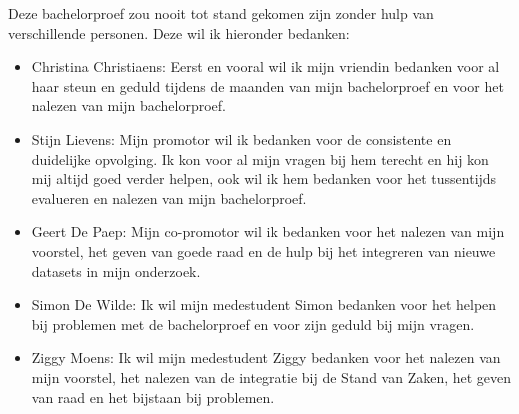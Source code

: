 Deze bachelorproef zou nooit tot stand gekomen zijn zonder hulp van verschillende personen. Deze wil ik hieronder bedanken:
\begin{itemize}
    \item Christina Christiaens: Eerst en vooral wil ik mijn vriendin bedanken voor al haar steun en geduld tijdens de maanden van mijn bachelorproef en voor het nalezen van mijn bachelorproef.
    \item Stijn Lievens: Mijn promotor wil ik bedanken voor de consistente en duidelijke opvolging. Ik kon voor al mijn vragen bij hem terecht en hij kon mij altijd goed verder helpen, ook wil ik hem bedanken voor het tussentijds evalueren en nalezen van mijn bachelorproef. 
    \item Geert De Paep: Mijn co-promotor wil ik bedanken voor het nalezen van mijn voorstel, het geven van goede raad en de hulp bij het integreren van nieuwe datasets in mijn onderzoek.
    \item Simon De Wilde: Ik wil mijn medestudent Simon bedanken voor het helpen bij problemen met de bachelorproef en voor zijn geduld bij mijn vragen.
    \item Ziggy Moens: Ik wil mijn medestudent Ziggy bedanken voor het nalezen van mijn voorstel, het nalezen van de integratie bij de Stand van Zaken, het geven van raad en het bijstaan bij problemen.
\end{itemize}
